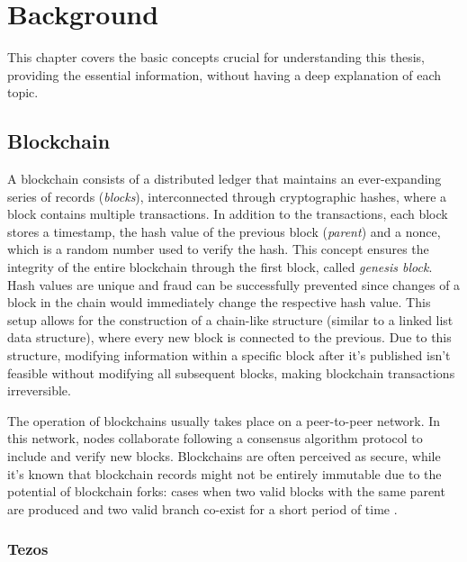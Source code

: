\chapter{Background\label{cha:chapter2}}

This chapter covers the basic concepts crucial for understanding this thesis, providing the essential information, without having a deep explanation of each topic.

\section{Blockchain}

A blockchain consists of a distributed ledger that maintains an ever-expanding series of records (\textit{blocks}), interconnected through cryptographic hashes, where a block contains multiple transactions. In addition to the transactions, each block stores a timestamp, the hash value of the previous block (\textit{parent}) and a nonce, which is a random number used to verify the hash. This concept ensures the integrity of the entire blockchain through the first block, called \textit{genesis block}. Hash values are unique and fraud can be successfully prevented since changes of a block in the chain would immediately change the respective hash value. This setup allows for the construction of a chain-like structure (similar to a linked list data structure), where every new block is connected to the previous. Due to this structure, modifying information within a specific block after it's published isn't feasible without modifying all subsequent blocks, making blockchain transactions irreversible. \cite{nofer_blockchain_2017}

The operation of blockchains usually takes place on a peer-to-peer network. In this network, nodes collaborate following a consensus algorithm protocol to include and verify new blocks. Blockchains are often perceived as secure, while it's known that blockchain records might not be entirely immutable due to the potential of blockchain forks: cases when two valid blocks with the same parent are produced and two valid branch co-exist for a short period of time \cite{goldberg_short_2019}.

\subsection{Tezos}

